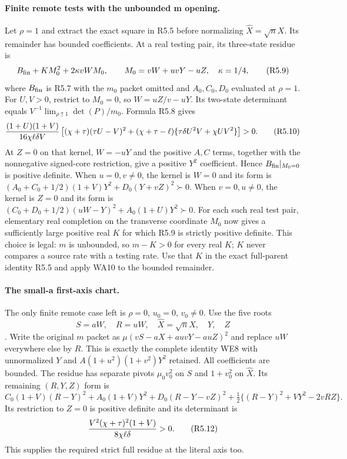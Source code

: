 \paragraph{Finite remote tests with the unbounded m opening.}
Let $\rho=1$ and extract the exact square in R5.5 before normalizing
$\widehat X=\sqrt nX$. Its remainder has bounded coefficients.
At a real testing pair, its three-state residue is
\[
 B_{\rm fin}+K M_0^2+2\kappa vW M_0,\qquad
 M_0=vW+uvY-uZ,\quad\kappa=1/4,                     \tag{R5.9}
\]
where $B_{\rm fin}$ is R5.7 with the $m_0$ packet omitted and
$A_0,C_0,D_0$ evaluated at $\rho=1$.
For $U,V>0$, restrict to $M_0=0$, so $W=uZ/v-uY$.
Its two-state determinant equals $V^{-1}\lim_{\rho\uparrow1}
\det(P)/m_0$. Formula R5.8 gives
\[
 { (1+U)(1+V)\over16\chi\ell\delta V}
 \left[(\chi+\tau)(\tau U-V)^2
 +(\chi+\tau-\ell)\{\tau\delta U^2V+\chi UV^2\}\right]>0.\tag{R5.10}
\]
At $Z=0$ on that kernel, $W=-uY$ and the positive $A,C$ terms,
together with the nonnegative signed-core restriction, give a positive
$Y^2$ coefficient. Hence $B_{\rm fin}|_{M_0=0}$ is positive definite.
When $u=0,v\ne0$, the kernel is $W=0$ and its form is
$(A_0+C_0+1/2)(1+V)Y^2+D_0(Y+vZ)^2\succ0$.
When $v=0,u\ne0$, the kernel is $Z=0$ and its form is
$(C_0+D_0+1/2)(uW-Y)^2+A_0(1+U)Y^2\succ0$.
For each such real test pair, elementary real completion on the
transverse coordinate $M_0$ now gives a sufficiently large positive
real $K$ for which R5.9 is strictly positive definite. This choice is
legal: $m$ is unbounded, so $m-K>0$ for every real $K$; $K$ never
compares a source rate with a testing rate. Use that $K$ in the exact
full-parent identity R5.5 and apply WA10 to the bounded remainder.

\paragraph{The small-a first-axis chart.}
The only finite remote case left is $\rho=0$, $u_0=0$, $v_0\ne0$.
Use the five roots
\[
 S=aW,\quad R=uW,\quad \widehat X=\sqrt nX,\quad Y,\quad Z
\]. Write the original $m$ packet as
$\mu(vS-aX+auvY-auZ)^2$ and replace $uW$ everywhere else by $R$.
This is exactly the complete identity WE8 with unnormalized $Y$ and
$A(1+u^2)(1+v^2)Y^2$ retained. All coefficients are bounded.
The residue has separate pivots $\mu_0v_0^2$ on $S$ and
$1+v_0^2$ on $\widehat X$. Its remaining $(R,Y,Z)$ form is
\[
 C_0(1+V)(R-Y)^2+A_0(1+V)Y^2+D_0(R-Y-vZ)^2
 +\tfrac12\{(R-Y)^2+VY^2-2vRZ\}.                  \tag{R5.11}
\]
Its restriction to $Z=0$ is positive definite and its determinant is
\[
 {V^2(\chi+\tau)^2(1+V)\over8\chi\ell\delta}>0.    \tag{R5.12}
\]
This supplies the required strict full residue at the literal axis too.

